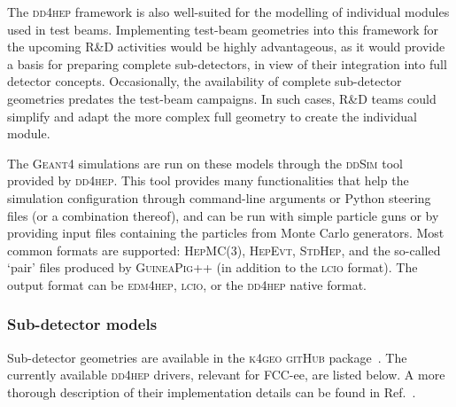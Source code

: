 The \textsc{dd4hep} framework is also well-suited for the modelling of individual modules used in test beams. 
Implementing test-beam geometries into this framework for the upcoming R\&D activities would be highly advantageous, 
as it would provide a basis for preparing complete sub-detectors, 
in view of their integration into full detector concepts. 
Occasionally, the availability of complete sub-detector geometries predates the test-beam campaigns. 
In such cases, R\&D teams could simplify and adapt the more complex full geometry to create the individual module.

The \textsc{Geant4} simulations are run on these models through the \textsc{ddSim} tool provided by \textsc{dd4hep}. 
This tool provides many functionalities that help the simulation configuration through command-line arguments or 
Python steering files (or a combination thereof), and can be run with simple particle guns or by providing input files containing the particles from Monte Carlo generators. 
Most common formats are supported: \textsc{HepMC(3)}, \textsc{HepEvt}, \textsc{StdHep}, 
and the so-called `pair' files produced by \textsc{GuineaPig++} 
(in addition to the \textsc{lcio} format). 
The output format can be \textsc{edm4hep}, \textsc{lcio}, or the \textsc{dd4hep} native format.

\subsubsection{Sub-detector models}
\label{sec:subdetectors}

Sub-detector geometries are available in the \textsc{k4geo} \textsc{gitHub} package~\cite{k4geo}.
The currently available \textsc{dd4hep} drivers, relevant for FCC-ee, are listed below. 
A more thorough description of their implementation details can be found in Ref.~\cite{softwareNote}.

